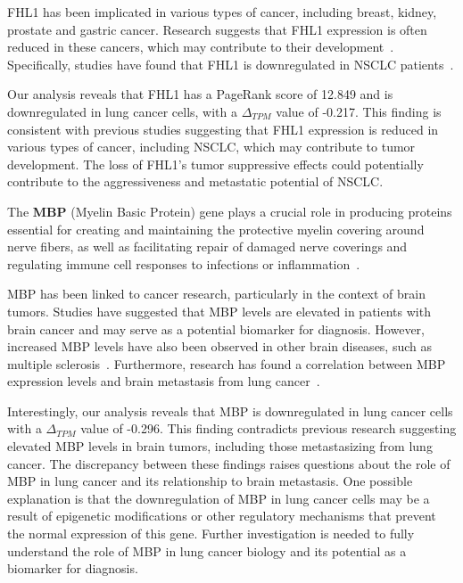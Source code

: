 FHL1 has been implicated in various types of cancer, including breast, kidney, prostate and gastric cancer.
Research suggests that FHL1 expression is often reduced in these cancers,
which may contribute to their development~\cite{Li2008FHL1, Sakashita2008FHL1}.
Specifically, studies have found that FHL1 is downregulated in NSCLC patients~\cite{Niu2012FHL1}.

Our analysis reveals that FHL1 has a PageRank score of 12.849 and is downregulated in lung cancer cells,
with a $\Delta_{TPM}$ value of -0.217.
This finding is consistent with previous studies suggesting that FHL1 expression is reduced in various types of cancer,
including NSCLC, which may contribute to tumor development.
The loss of FHL1's tumor suppressive effects could potentially contribute to the aggressiveness and metastatic potential of NSCLC.
\newline

The \textbf{MBP} (Myelin Basic Protein) gene plays a crucial role in producing proteins essential for creating and
maintaining the protective myelin covering around nerve fibers, as well as
facilitating repair of damaged nerve coverings and regulating immune cell responses to infections or inflammation~\cite{Nye1995MBP}.

MBP has been linked to cancer research, particularly in the context of brain tumors.
Studies have suggested that MBP levels are elevated in patients with brain cancer and may serve as a potential biomarker for diagnosis.
However, increased MBP levels have also been observed in other brain diseases, such as multiple sclerosis~\cite{Zavialova2017MBP}.
Furthermore, research has found a correlation between MBP expression levels and brain metastasis from lung cancer~\cite{Nakagawa1994MBP}.

Interestingly, our analysis reveals that MBP is downregulated in lung cancer cells with a $\Delta_{TPM}$ value of -0.296.
This finding contradicts previous research suggesting elevated MBP levels in brain tumors,
including those metastasizing from lung cancer.
The discrepancy between these findings raises questions about the role of MBP in lung cancer and its relationship to brain metastasis.
One possible explanation is that the downregulation of MBP in lung cancer cells may be a result of epigenetic modifications
or other regulatory mechanisms that prevent the normal expression of this gene.
Further investigation is needed to fully understand the role of MBP in lung cancer biology and its potential as a biomarker for diagnosis.
\newline

